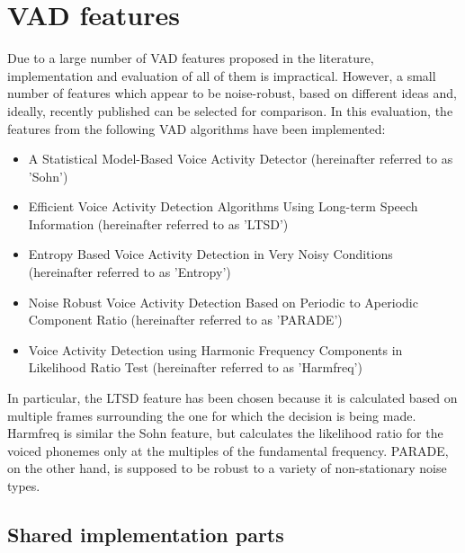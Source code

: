 
\section{VAD features}

Due to a large number of VAD features proposed in the literature, implementation and evaluation of all of them is impractical. However, a small number of features which appear to be noise-robust, based on different ideas and, ideally, recently published can be selected for comparison. In this evaluation, the features from the following VAD algorithms have been implemented:

\begin{itemize}
\item A Statistical Model-Based Voice Activity Detector \cite{Sohn} (hereinafter referred to as 'Sohn')
\item Efficient Voice Activity Detection Algorithms Using Long-term Speech Information \cite{LTSD} (hereinafter referred to as 'LTSD')
\item Entropy Based Voice Activity Detection in Very Noisy Conditions \citep{Renevey} (hereinafter referred to as 'Entropy')
\item Noise Robust Voice Activity Detection Based on Periodic to Aperiodic Component Ratio \cite{PARADE} (hereinafter referred to as 'PARADE')
\item Voice Activity Detection using Harmonic Frequency Components in Likelihood Ratio Test \cite{Tan} (hereinafter referred to as 'Harmfreq')
\end{itemize}

In particular, the LTSD feature has been chosen because it is calculated based on multiple frames surrounding the one for which the decision is being made. Harmfreq is similar the Sohn feature, but calculates the likelihood ratio for the voiced phonemes only at the multiples of the fundamental frequency. PARADE, on the other hand, is supposed to be robust to a variety of non-stationary noise types.

\subsection{Shared implementation parts}

